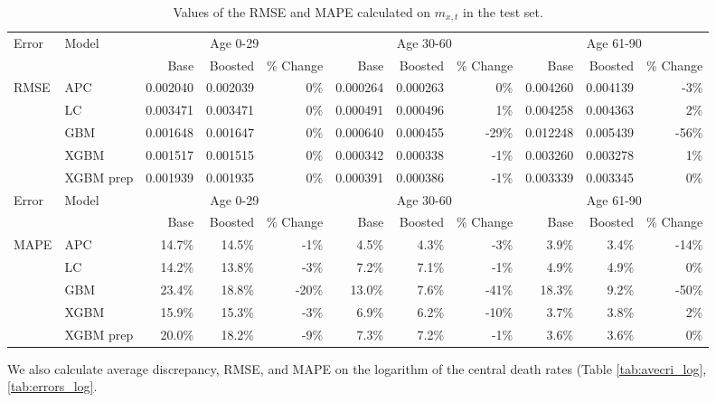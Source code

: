 \documentclass[fleqn,10pt]{wlscirep}
\begin{document}
\begin{table}[ht]
\centering
\footnotesize
\begin{tabular}{|l|l|r|r|r|r|r|r|r|r|r|}
\hline
\multirow{2}{*}{Error} & \multirow{2}{*}{Model} & \multicolumn{3}{c|}{Age 0-29} & \multicolumn{3}{c|}{Age 30-60} & \multicolumn{3}{c|}{Age 61-90} \\
\cline{3-11}
&			&	Base 	&	Boosted 	& \% Change &	Base 	&	Boosted 	& \% Change &	Base 	&	Boosted	& \% Change\\
\hline
\multirow{5}{*}{RMSE}  & APC 	&	0.002040	&	0.002039	&	0\%	&	0.000264	&	0.000263	&	0\%	&	0.004260	&	0.004139	&	-3\%	\\
& LC 	&	0.003471	&	0.003471	&	0\%	&	0.000491	&	0.000496	&	1\%	&	0.004258	&	0.004363	&	2\%	\\
& GBM 	&	0.001648	&	0.001647	&	0\%	&	0.000640	&	0.000455	&	-29\%	&	0.012248	&	0.005439	&	-56\%	\\
& XGBM 	&	0.001517	&	0.001515	&	0\%	&	0.000342	&	0.000338	&	-1\%	&	0.003260	&	0.003278	&	1\%	\\
& XGBM prep 	&	0.001939	&	0.001935	&	0\%	&	0.000391	&	0.000386	&	-1\%	&	0.003339	&	0.003345	&	0\%	\\
\hline
\multirow{2}{*}{Error} & \multirow{2}{*}{Model} & \multicolumn{3}{c|}{Age 0-29} & \multicolumn{3}{c|}{Age 30-60} & \multicolumn{3}{c|}{Age 61-90} \\
\cline{3-11}
&			&	Base 	&	Boosted 	& \% Change &	Base 	&	Boosted 	& \% Change &	Base 	&	Boosted	& \% Change\\
\hline
\multirow{5}{*}{MAPE}  & APC 			&	14.7\%	&	14.5\%	&	-1\%		&	4.5\%	&	4.3\%	&	-3\%		&	3.9\%	&	3.4\%	&	-14\% \\
& LC 			&	14.2\%	&	13.8\%	&	-3\%		&	7.2\%	&	7.1\%	&	-1\%		&	4.9\%	&	4.9\%	&	0\%	\\
& GBM 		&	23.4\%	&	18.8\%	&	-20\%	&	13.0\%	&	7.6\%	&	-41\%	&	18.3\%	&	9.2\%	&	-50\% \\
& XGBM 		&	15.9\%	&	15.3\%	&	-3\%		&	6.9\%	&	6.2\%	&	-10\%	&	3.7\%	&	3.8\%	&	2\%	\\
& XGBM prep 	&	20.0\%	&	18.2\%	&	-9\%		&	7.3\%	&	7.2\%	&	-1\%		&	3.6\%	&	3.6\%	&	0\%	\\
\hline
\end{tabular}
\caption{Values of the RMSE and MAPE calculated on $m_{x,t}$ in the test set.}
\label{tab:errors}
\end{table}
%
\color{blue}
We also calculate average discrepancy, RMSE, and MAPE on the logarithm of the central death rates (Table \ref{tab:avecri_log}, \ref{tab:errors_log}. 
\end{document}
